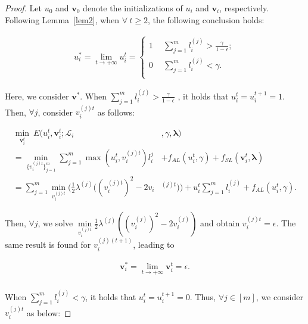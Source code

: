 \documentclass[journal]{IEEEtran}
\begin{document}
{{\begin{proof}
Let $u_0$ and $\mathbf{v}_{0}$ denote the initializations of $u_i$ and $\mathbf{v}_i$, respectively. Following Lemma~\ref{lem2}, when $\forall~t\geq 2$, the following conclusion holds:
		\begin{small}
			\begin{equation}
			\begin{aligned}
			u_i^\ast=\lim_{t \to +\infty}u_i^t=\left\{
			\begin{aligned}
			1  \ \ &\sum_{j=1}^{m}l_i^{(j)} > \frac{\gamma}{1-\epsilon}; \\
			0  \ \ &\sum_{j=1}^{m}l_i^{(j)} < \gamma. \\  
			\end{aligned}
			\right.
			\end{aligned}\label{eq8}
			\end{equation}
		\end{small}Here, we consider $\mathbf{v}^\ast$. When $\sum_{j=1}^{m}l_i^{(j)} > \frac{\gamma}{1-\epsilon}$ , it holds that $u_i^{t}=u_i^{t+1}=1$. Then, $\forall j$, consider $v_i^{(j)t}$ as follows:
		\begin{small}
\begin{displaymath}
\begin{aligned}
\underset{\mathbf{v}_i^t}{\min} \ E(u_i^t,\mathbf{v}_i^t;\mathcal{L}_i&,\gamma,{\bm \lambda}) \\= \underset{\{v_i^{(j)t}\}^m_{j=1}}{\min}\sum_{j=1}^{m}\max(u_i^t,v_i^{(j)t})l_i^j &+ f_{AL}(u_i^t,\gamma) + f_{SL}(\mathbf{v}_i^t,{\bm \lambda})\\=
\sum_{j=1}^{m}\underset{v_i^{(j)t}}{\min}( \frac{1}{2}\lambda^{(j)}((v_i^{(j)t})^2-2v_i&^{(j)t})) + u_i^t\sum_{j=1}^{m}l_i^{(j)} + f_{AL}(u_i^t,\gamma).
\end{aligned}
\end{displaymath}
		\end{small}Then, $\forall j$, we solve $\underset{v_i^{(j)t}}{\min}\frac{1}{2}\lambda^{(j)}((v_i^{(j)})^2-2v_i^{(j)})$ and obtain $v_i^{(j)t}=\epsilon$. The same result is found for $v_i^{(j)(t+1)}$, leading to
		\begin{small}
			\begin{equation}
			\begin{aligned}
			\mathbf{v}_i^\ast=\lim_{t \to +\infty}\mathbf{v}_i^t=
			\epsilon.  \\  
			\end{aligned}\label{eq9}
			\end{equation}
		\end{small}When $\sum_{j=1}^{m}l_i^{(j)} < \gamma$, it holds that $u_i^{t}=u_i^{t+1}=0$. Thus, $\forall j\in[m]$, we consider $v_i^{(j)t}$ as below:

\end{proof}}}
\end{document}
